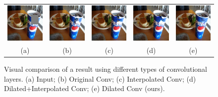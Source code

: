 \begin{figure}[h!]
\centering
\small
\begin{tabular}{ccccc}
\includegraphics[width=.2\textwidth]{figures/conv/000000311303_input_image.jpg}&
\includegraphics[width=.2\textwidth]{figures/conv/000000311303_synthesized_image.jpg}&
\includegraphics[width=.2\textwidth]{figures/conv/000000311303_synthesized_image-0.jpg}&
\includegraphics[width=.2\textwidth]{figures/conv/000000311303_synthesized_image-1.jpg}&
\includegraphics[width=.2\textwidth]{figures/conv/000000311303_synthesized_image_final.jpg}\\
(a) & (b) & (c) & (d) & (e)  \\
\end{tabular}
\caption{Visual comparison of a result using different types of convolutional layers. (a) Input; (b) Original Conv; (c) Interpolated Conv; (d) Dilated+Interpolated Conv; (e) Dilated Conv (ours).}
\label{fig:conv}
\vspace{-15pt}
\end{figure}  

